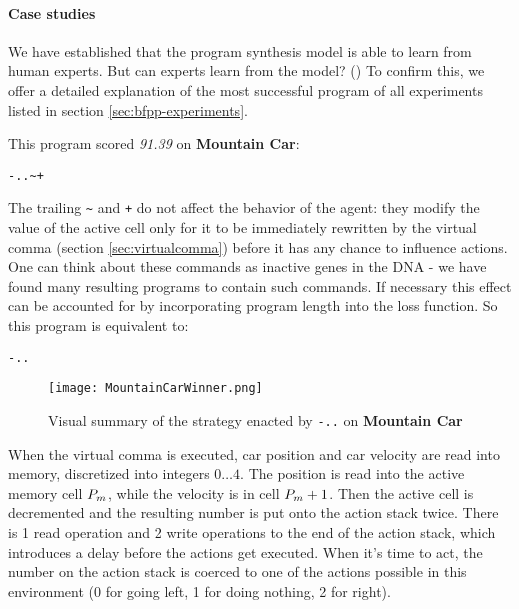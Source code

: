 \paragraph{Case studies}
\label{sec:casestudies}

We have established that the program synthesis model is able to learn from human experts.
But can experts learn from the model? (\rqbfppexplainable) 
To confirm this, we offer a detailed explanation of the most successful program of all experiments listed in section \ref{sec:bfpp-experiments}.

This program scored \emph{91.39} on \textbf{Mountain Car}:

\begin{center}
\begin{lstlisting}
-..~+
\end{lstlisting}
\end{center}

The trailing \verb|~| and \verb|+| do not affect the behavior of the agent: they modify the value of the active cell only for it to be immediately rewritten by the virtual comma (section \ref{sec:virtualcomma}) before it has any chance to influence actions.
One can think about these commands as inactive genes in the DNA - we have found many resulting programs to contain such commands.
If necessary this effect can be accounted for by incorporating program length into the loss function.
So this program is equivalent to:

\begin{center}
\begin{lstlisting}
-..
\end{lstlisting}
\end{center}

\begin{figure}
    \centering
    \texttt{[image: MountainCarWinner.png]}
    \caption{Visual summary of the strategy enacted by \texttt{-..} on \textbf{Mountain Car}}
    \label{fig:mountaincarwinner}
\end{figure}

When the virtual comma is executed, car position and car velocity are read into memory, discretized into integers $0\dots4$.
The position is read into the active memory cell $P_m$, while the velocity is in cell $P_m+1$.
Then the active cell is decremented and the resulting number is put onto the action stack twice.
There is 1 read operation and 2 write operations to the end of the action stack, which introduces a delay before the actions get executed.
When it's time to act, the number on the action stack is coerced to one of the actions possible in this environment (0 for going left, 1 for doing nothing, 2 for right). 

